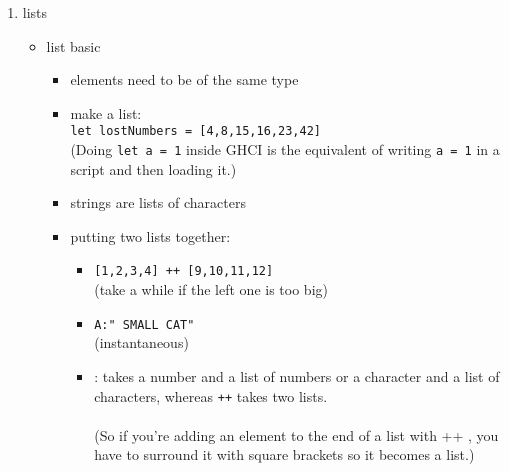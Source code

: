 \documentclass[a4paper,10pt]{article}
\begin{document}
\begin{enumerate}
\begin{enumerate}
\begin{itemize}
\begin{itemize}
\begin{itemize}
    \\\textbf{notes:} That apostrophe (\textquotesingle) doesn't have any special meaning. It's ok in a function name. We usually use \textquotesingle \ to either denote a strict version of a function (one that isn't lazy) or a slightly modified version of a function or a
variable.\\
   \end{itemize}
   \item what is more:
   \begin{itemize}
    \item Functions can't begin with uppercase letters.
    \item When a function doesn't take any parameters, we usually say it's a definition (or a name):
    \\\texttt{conanO\textquotesingle Brien = "It\textquotesingle s a-me, Conan O\textquotesingle Brien!"}
   \end{itemize}
  \end{itemize}
  \end{itemize}
  \item lists
  \begin{itemize}
   \item list basic
  \begin{itemize}
   \item elements need to be of the same type
   \item make a list:
   \\\texttt{let lostNumbers = [4,8,15,16,23,42]}
   \\(Doing \texttt{let a = 1} inside GHCI is the equivalent of writing \texttt{a = 1} in a script and then loading it.)
   \item  strings are lists of characters
   \item putting two lists together:
   \begin{itemize}
    \item \texttt{[1,2,3,4] ++ [9,10,11,12]}
    \\(take a while if the left one is too big)
    \\\item \texttt{\textquotesingle A\textquotesingle:" SMALL CAT"}
    \\(instantaneous)
    \\\item \texttt{}{:} takes a number and a list of numbers or a character and a list of characters, whereas \texttt{++} takes two lists. 
    \\\\(So if you're adding an element to the end of a list with ++ , you have to surround it with square brackets so it becomes a list.)

\end{itemize}
\end{itemize}
\end{itemize}
\end{enumerate}
\end{enumerate}
\end{document}
